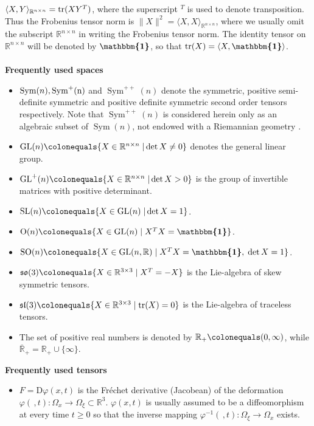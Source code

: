 \documentclass[10pt]{article}
\numberwithin{theoremCounter}{section}
\theoremstyle{plain}
\theoremstyle{definition}
\newcommand{\id}{{\boldsymbol{\mathbbm{1}}}}
\newcommand{\R}{\mathbb{R}}
\newcommand{\norm}[1]{\lVert #1 \rVert}
\newcommand{\DD}{\mathrm{D}}
\DeclareMathOperator{\Sym}{Sym}
\DeclareMathOperator{\tr}{tr}
\def\tr{\textnormal{tr}}
\numberwithin{equation}{section}
\begin{document}
\begin{appendix}
$\langle {X},{Y}\rangle_{\R^{n\times n}}=\tr{(X Y^T)}$, where the superscript $^T$ is used to denote transposition. Thus the Frobenius tensor norm is $\norm{X}^2=\langle {X},{X}\rangle_{\R^{n\times n}}$, where we usually omit the subscript $\R^{n\times n}$ in writing the Frobenius tensor norm. The identity tensor on $\R^{n\times n}$ will be denoted by $\id$, so that $\tr{(X)}=\langle {X},{\id}\rangle$. \\
\\
\noindent \textbf{Frequently used spaces} 
	\begin{itemize}
	\item $\Sym(n), \rm \Sym^+(n)$ and $\Sym^{++}(n)$ denote the symmetric, positive semi-definite symmetric and positive definite symmetric second order tensors respectively. Note that $\Sym^{++}(n)$ is considered herein only as an algebraic subset of $\Sym(n)$, not endowed with a Riemannian geometry \cite{fiala2009, fiala2016, fiala2020objective, kolev2024objective}.
	\item ${\rm GL}(n)\colonequals\{X\in\R^{n\times n}\;|\det{X}\neq 0\}$ denotes the general linear group.
	\item ${\rm GL}^+(n)\colonequals\{X\in\R^{n\times n}\;|\det{X}>0\}$ is the group of invertible matrices with positive determinant.
	\item ${\rm SL}(n)\colonequals\{X\in {\rm GL}(n)\;|\det{X}=1\}$.
	\item $\mathrm{O}(n)\colonequals\{X\in {\rm GL}(n)\;|\;X^TX=\id\}$.
	\item ${\rm SO}(n)\colonequals\{X\in {\rm GL}(n,\R)\;|\; X^T X=\id,\;\det{X}=1\}$.
	\item $\mathfrak{so}(3)\colonequals\{X\in\mathbb{R}^{3\times3}\;|\;X^T=-X\}$ is the Lie-algebra of skew symmetric tensors.
	\item $\mathfrak{sl}(3)\colonequals\{X\in\mathbb{R}^{3\times3}\;|\; \tr({X})=0\}$ is the Lie-algebra of traceless tensors.
	\item The set of positive real numbers is denoted by $\R_+\colonequals(0,\infty)$, while $\overline{\R}_+=\R_+\cup \{\infty\}$.
	\end{itemize}
%
\textbf{Frequently used tensors}
	\begin{itemize}
	\item $F = \DD \varphi(x,t)$ is the Fréchet derivative (Jacobean) of the deformation $\varphi(\,,t)\colon\Omega_x \to \Omega_{\xi} \subset \R^3$. $\varphi(x,t)$ is usually assumed to be a diffeomorphism at every time $t \ge 0$ so that the inverse mapping $\varphi^{-1}(\,,t)\colon\Omega_{\xi} \to \Omega_x$ exists.

\end{itemize}
\end{appendix}
\end{document}
